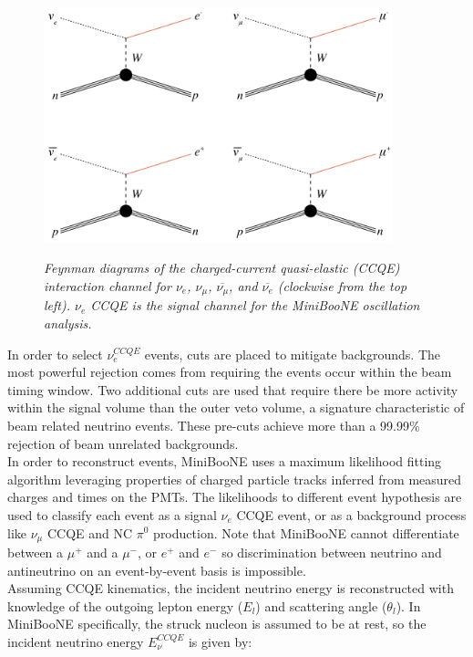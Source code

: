 \begin{figure}[ht!]
\centering
	\includegraphics[width=0.9\textwidth]{Figures/georgia_ccqe_feynman.png} \\
\caption{\textit{Feynman diagrams of the charged-current quasi-elastic (CCQE) interaction channel for $\nu_e$, $\nu_\mu$, $\overline{\nu_\mu}$, and $\overline{\nu_e}$ (clockwise from the top left). $\nu_e$ CCQE is the signal channel for the MiniBooNE oscillation analysis.}}\label{georgia_ccqe_feynman_fig}
\end{figure}


In order to select $\nu_e^{CCQE}$ events, cuts are placed to mitigate backgrounds. The most powerful rejection comes from requiring the events occur within the beam timing window. Two additional cuts are used that require there be more activity within the signal volume than the outer veto volume, a signature characteristic of beam related neutrino events. These pre-cuts achieve more than a 99.99\% rejection of beam unrelated backgrounds.\\

In order to reconstruct events, MiniBooNE uses a maximum likelihood fitting algorithm leveraging properties of charged particle tracks inferred from measured charges and times on the PMTs. The likelihoods to different event hypothesis are used to classify each event as a signal $\nu_e$ CCQE event, or as a background process like $\nu_\mu$ CCQE and NC $\pi^0$ production. Note that MiniBooNE cannot differentiate between a $\mu^+$ and a $\mu^-$, or $e^+$ and $e^-$ so discrimination between neutrino and antineutrino on an event-by-event basis is impossible.\\

Assuming CCQE kinematics, the incident neutrino energy is reconstructed with knowledge of the outgoing lepton energy ($E_l$) and scattering angle ($\theta_l$). In MiniBooNE specifically, the struck nucleon is assumed to be at rest, so the incident neutrino energy $E_\nu^{CCQE}$ is given by:

